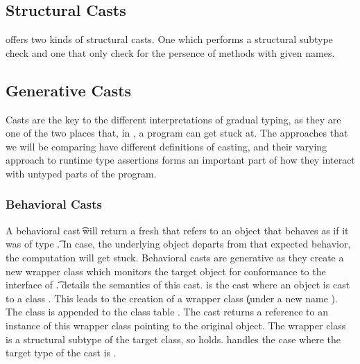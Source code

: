 \documentclass[a4paper,USenglish]{tex/lipics-v2016}
\begin{document}
\newpage

\subsection{Structural Casts}

\name offers two kinds of structural casts. One which performs a structural
subtype check and one that only check for the persence of methods with given
names.

\newpage



\subsection{Generative Casts}

Casts are the key to the different interpretations of gradual typing, as
they are one of the two places that, in \name, a program can get stuck
at. The approaches that we will be comparing have different definitions of
casting, and their varying approach to runtime type assertions forms an
important part of how they interact with untyped parts of the program.

\subsubsection{Behavioral Casts}

A behavioral cast \BehCast\t\a will return a fresh \ap that refers to an
object that behaves as if it was of type \t. In case, the underlying object
departs from that expected behavior, the computation will get
stuck. Behavioral casts are generative as they create a new wrapper class
which monitors the target object for conformance to the interface of \t.
 details the semantics of this cast.  is the
cast where an object \obj\C{\b\a} is cast to a class \Cp. This leads to the
creation of a wrapper class \k (under a new name \D). The class is appended
to the class table \K.  The cast returns a reference \ap to an instance of
this wrapper class pointing to the original object. The wrapper class is a
structural subtype of the target class, so \D\Sub\C holds. 
handles the case where the target type of the cast is \any.
\end{document}
